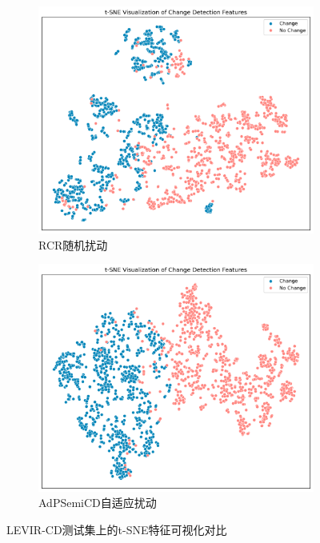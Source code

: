 \documentclass[lang=chs, degree=master, blindreview=false, adobe=false]{yanputhesis}
\begin{document}
\begin{figure}[H]
  \centering
  \hspace*{\fill} %
  \begin{subfigure}[t]{0.46\textwidth} %
      \centering
      \includegraphics[scale=0.36]{images/tsne_5RCRl.png}
      \caption{RCR随机扰动}
      \label{fig:tsneL_left}
  \end{subfigure}
  \hfill %
  \begin{subfigure}[t]{0.46\textwidth} %
      \centering
      \includegraphics[scale=0.36]{images/tsne_5AdPl.png} %
      \caption{AdPSemiCD自适应扰动} %
      \label{fig:tsneL_right}
  \end{subfigure}
  \hspace*{\fill} %
  \caption{LEVIR-CD测试集上的t-SNE特征可视化对比}
  \label{fig:AdP_tsneL}
\end{figure}
\end{document}

